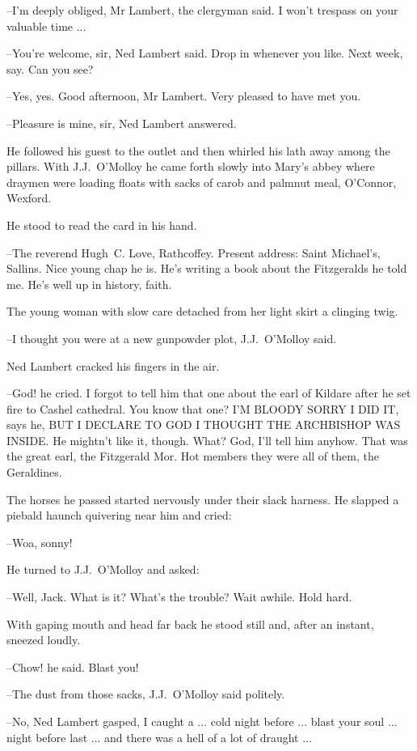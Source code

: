 --I'm deeply obliged, Mr Lambert,
the clergyman said.
I won't trespass on
your valuable time ...

--You're welcome, sir,
Ned Lambert said.
Drop in whenever you like.
Next
week, say.
Can you see?

--Yes, yes.
Good afternoon, Mr Lambert.
Very pleased to have met you.

--Pleasure is mine, sir,
Ned Lambert answered.

He followed his guest to the outlet
and then whirled his lath away
among the pillars.
With J.J.~O'Molloy he came forth slowly
into Mary's
abbey
where draymen were loading floats with sacks of carob and palmnut
meal,
O'Connor, Wexford.

He stood to read the card in his hand.

--The reverend Hugh~C. Love, Rathcoffey.
Present address:
Saint Michael's, Sallins.
Nice young chap he is.
He's writing a book about the Fitzgeralds
he told me.
He's well up in history, faith.

The young woman with slow care
detached from her light skirt a clinging twig.

--I thought you were at a new gunpowder plot,
J.J.~O'Molloy said.

Ned Lambert cracked his fingers in the air.

--God!
he cried.
I forgot to tell him that one about the earl of Kildare
after he set fire to Cashel cathedral.
You know that one? I'M BLOODY SORRY
I DID IT,
says he,
BUT I DECLARE TO GOD I THOUGHT THE ARCHBISHOP WAS
INSIDE.
He mightn't like it, though.
What?
God, I'll tell him anyhow.
That was the great earl, the Fitzgerald Mor.
Hot members they were all of
them, the Geraldines.

The horses he passed
started nervously
under their slack harness.
He slapped a piebald haunch quivering near him
and cried:

--Woa, sonny!

He turned to J.J.~O'Molloy and asked:

--Well, Jack.
What is it?
What's the trouble?
Wait awhile.
Hold hard.

With gaping mouth and head far back
he stood still and, after an
instant,
sneezed loudly.

--Chow!
he said.
Blast you!

--The dust from those sacks,
J.J.~O'Molloy said politely.

--No,
Ned Lambert gasped,
I caught a ...
cold night before ...
blast your soul ...
night before last ...
and there was a hell of a lot of draught ...

